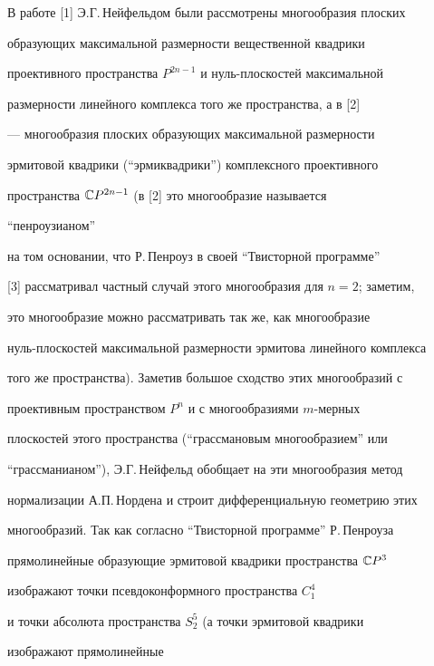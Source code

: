 \maketitle


\label{begin}





В работе [1] Э.Г.\,Нейфельдом были рассмотрены многообразия плоских


образующих максимальной размерности вещественной квадрики


проективного пространства $P^{2n-1}$ и нуль-плос\-ко\-стей максимальной


размерности линейного комплекса того же пространства, а в [2]


--- многообразия плоских образующих максимальной размерности


эрмитовой квадрики (``эрмиквадрики'') комплексного проективного


пространства $\Bbb CP^{2n-1}$ (в [2] это многообразие называется


``пенроузианом''


на том основании, что Р.\,Пенроуз в своей ``Твисторной программе''


[3] рассматривал частный случай этого многообразия для $n=2$; заметим,


это многообразие можно рассматривать так же, как многообразие


нуль-плоскостей максимальной размерности эрмитова линейного комплекса


того же пространства). Заметив большое сходство этих многообразий с


проективным пространством $P^n$ и с многообразиями $m$-мерных


плоскостей этого пространства (``грассмановым многообразием'' или


``грассманианом''), Э.Г.\,Нейфельд обобщает на эти многообразия метод


нормализации А.П.\,Нордена и строит дифференциальную геометрию этих


многообразий. Так как согласно ``Твисторной программе'' Р.\,Пенроуза


прямолинейные образующие эрмитовой квадрики пространства $\Bbb CP^3$


изображают точки псевдоконформного пространства $C^4_1$


и точки абсолюта пространства $S^5_2$ (а точки эрмитовой квадрики


изображают прямолинейные


